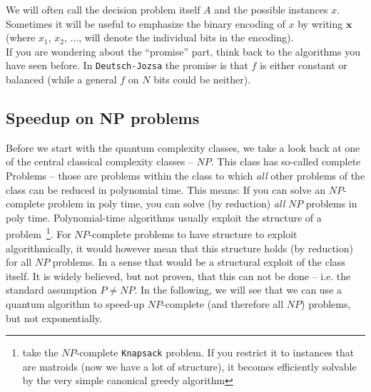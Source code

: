 We will often call the decision problem itself $A$ and the possible instances $x$. Sometimes it will be useful to emphasize the binary encoding of $x$ by writing $\mathbf{x}$ (where $x_1$, $x_2$, $\dots$, will denote the individual bits in the encoding).\\

If you are wondering about the ``promise'' part, think back to the algorithms you have seen before. In \texttt{Deutsch-Jozsa} the promise is that $f$ is either constant or balanced (while a general $f$ on $N$ bits could be neither). 

\subsection{Speedup on NP problems}
Before we start with the quantum complexity classes, we take a look back at one of the central classical complexity classes -- $NP$. 
This class has so-called complete Problems -- those are problems within the class to which \textit{all} other problems of the class can be reduced in polynomial time.
This means: If you can solve an $NP$-complete problem in poly time, you can solve (by reduction) \textit{all} $NP$ problems in poly time. Polynomial-time algorithms usually exploit the structure of a problem~\footnote{take the $NP$-complete \texttt{Knapsack} problem. If you restrict it to instances that are matroids (now we have a lot of structure), it becomes efficiently solvable by the very simple canonical greedy algorithm}. For $NP$-complete problems to have structure to exploit algorithmically, it would however mean that this structure holds (by reduction) for all $NP$ problems. In a sense that would be a structural exploit of the class itself. It is widely believed, but not proven, that this can not be done -- i.e. the standard assumption $P\neq NP$. In the following, we will see that we can use a quantum algorithm to speed-up $NP$-complete (and therefore all $NP$) problems, but not exponentially. \\

